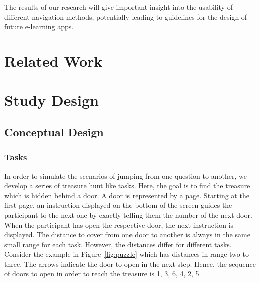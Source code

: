 \documentclass{sig-alternate-05-2015}
\begin{document}
The results of our research will give important insight into the usability of different navigation methods, potentially leading to guidelines for the design of future e-learning apps.
\section{Related Work}

\section{Study Design}
\subsection{Conceptual Design}
\subsubsection{Tasks}
In order to simulate the scenarios of jumping from one question to another, we develop a series of treasure hunt like tasks. Here, the goal is to find the treasure which
is hidden behind a door. A door is represented by a page. Starting at the first page, an instruction displayed on the bottom of the screen guides the participant to the next one
by exactly telling them the number of the next door. When the participant has open the respective door, the next
instruction is displayed. The distance to cover from one door to another is always in the same small range for each task. However, the distances differ for
different tasks. Consider the example in Figure~\ref{fig:puzzle} which has distances in range two to three. The arrows indicate the door to open in
the next step. Hence, the sequence of doors to open in order to reach the treasure is 1, 3, 6, 4, 2, 5.
\end{document}

